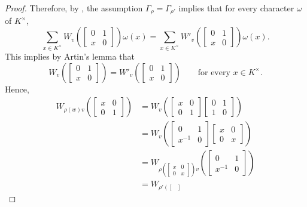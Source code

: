 \documentclass[../main.tex]{subfiles}
\begin{document}
\begin{proof}
	Therefore, by , the assumption $\Gamma_{\rho}=\Gamma_{\rho'}$ implies that for every character $\omega$ of $K^\times$,
	\[\sum_{x\in K^\times}W_v\left(\begin{bmatrix}
		0 & 1 \\
		x & 0
	\end{bmatrix}\right)\omega(x)=\sum_{x\in K^\times}W'_v\left(\begin{bmatrix}
		0 & 1 \\
		x & 0
	\end{bmatrix}\right)\omega(x).\]
	This implies by Artin's lemma that
	\[W_v\left(\begin{bmatrix}
		0 & 1 \\
		x & 0
	\end{bmatrix}\right)=W'_v\left(\begin{bmatrix}
		0 & 1 \\
		x & 0
	\end{bmatrix}\right)\qquad\text{for every }x\in K^\times.\]
	Hence,
	\begin{align*}
		W_{\rho(w)v}\left(\begin{bmatrix}
			x & 0 \\
			0 & 1
		\end{bmatrix}\right) &= W_v\left(\begin{bmatrix}
			x & 0 \\
			0 & 1
		\end{bmatrix}\begin{bmatrix}
			0 & 1 \\
			1 & 0
		\end{bmatrix}\right) \\
		&= W_v\left(\begin{bmatrix}
			0 & 1 \\
			x^{-1} & 0
		\end{bmatrix}\begin{bmatrix}
			x & 0 \\
			0 & x
		\end{bmatrix}\right) \\
		&= W_{\rho\left(\begin{bmatrix}
			x & 0 \\
			0 & x
		\end{bmatrix}\right)v}\left(\begin{bmatrix}
			0 & 1 \\
			x^{-1} & 0
		\end{bmatrix}\right) \\
		&= W_{\rho'\left(\begin{bmatrix}

\end{bmatrix}}
\end{align*}
\end{proof}
\end{document}
